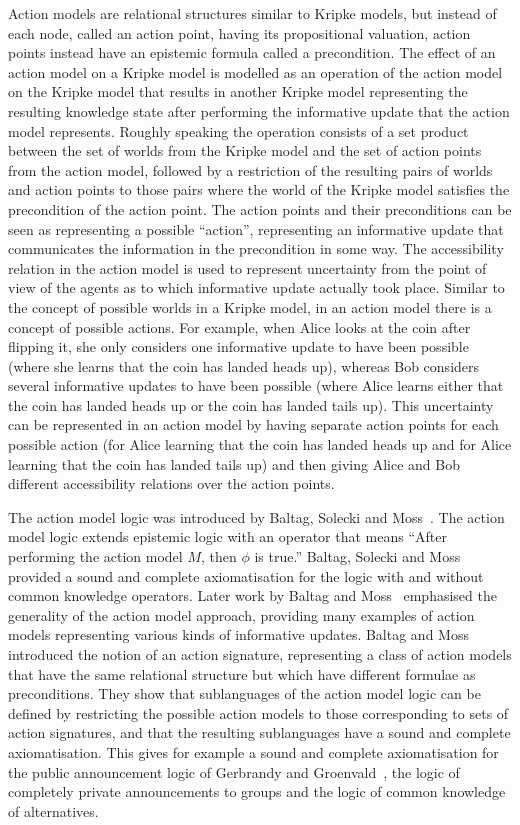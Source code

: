 Action models are relational structures similar to Kripke models, but instead of
each node, called an action point, having its propositional valuation, action
points instead have an epistemic formula called a precondition. The effect of an
action model on a Kripke model is modelled as an operation of the action model
on the Kripke model that results in another Kripke model representing the
resulting knowledge state after performing the informative update that the
action model represents. Roughly speaking the operation consists of a set
product between the set of worlds from the Kripke model and the set of action
points from the action model, followed by a restriction of the resulting pairs
of worlds and action points to those pairs where the world of the Kripke model
satisfies the precondition of the action point. The action points and their
preconditions can be seen as representing a possible ``action'', representing an
informative update that communicates the information in the precondition in some
way. The accessibility relation in the action model is used to represent
uncertainty from the point of view of the agents as to which informative update
actually took place. Similar to the concept of possible worlds in a Kripke
model, in an action model there is a concept of possible actions. For example,
when Alice looks at the coin after flipping it, she only considers one
informative update to have been possible (where she learns that the coin has
landed heads up), whereas Bob considers several informative updates to have been
possible (where Alice learns either that the coin has landed heads up or the
coin has landed tails up). This uncertainty can be represented in an action
model by having separate action points for each possible action (for Alice
learning that the coin has landed heads up and for Alice learning that the coin
has landed tails up) and then giving Alice and Bob different accessibility
relations over the action points.

The action model logic was introduced by Baltag, Solecki and
Moss~\cite{baltag:1998, baltag:1999}. The action model logic extends epistemic
logic with an operator that means ``After performing the action model $M$, then
$\phi$ is true.'' Baltag, Solecki and Moss~\cite{baltag:1998} provided a sound
and complete axiomatisation for the logic with and without common knowledge
operators. Later work by Baltag and Moss~\cite{baltag:2004} emphasised the
generality of the action model approach, providing many examples of action
models representing various kinds of informative updates. Baltag and
Moss~\cite{baltag:2004} introduced the notion of an action signature,
representing a class of action models that have the same relational structure
but which have different formulae as preconditions. They show that sublanguages
of the action model logic can be defined by restricting the possible action
models to those corresponding to sets of action signatures, and that the
resulting sublanguages have a sound and complete axiomatisation. This gives for
example a sound and complete axiomatisation for the public announcement logic of
Gerbrandy and Groenvald~\cite{gerbrandy:1997}, the logic of completely private
announcements to groups and the logic of common knowledge of alternatives.

